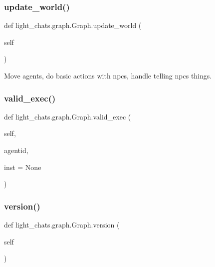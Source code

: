 \subsubsection{\texorpdfstring{update\+\_\+world()}{update\_world()}}
{\footnotesize\ttfamily def light\+\_\+chats.\+graph.\+Graph.\+update\+\_\+world (\begin{DoxyParamCaption}\item[{}]{self }\end{DoxyParamCaption})}

\begin{DoxyVerb}Move agents, do basic actions with npcs, handle telling npcs things.
\end{DoxyVerb}
 \mbox{\label{classlight__chats_1_1graph_1_1Graph_accd7dfd84e4f2bee3fc3fbac8d8577cd}} 
\subsubsection{\texorpdfstring{valid\+\_\+exec()}{valid\_exec()}}
{\footnotesize\ttfamily def light\+\_\+chats.\+graph.\+Graph.\+valid\+\_\+exec (\begin{DoxyParamCaption}\item[{}]{self,  }\item[{}]{agentid,  }\item[{}]{inst = {\ttfamily None} }\end{DoxyParamCaption})}

\mbox{\label{classlight__chats_1_1graph_1_1Graph_a7094a23385f250b9ea06d07c515ad14c}} 
\subsubsection{\texorpdfstring{version()}{version()}}
{\footnotesize\ttfamily def light\+\_\+chats.\+graph.\+Graph.\+version (\begin{DoxyParamCaption}\item[{}]{self }\end{DoxyParamCaption})}



